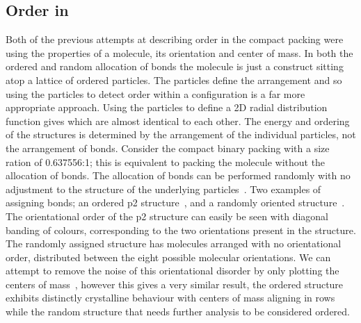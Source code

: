 \subsection{Order in \scon}

Both of the previous attempts at describing order in the compact packing were using the properties of a molecule, its orientation and center of mass. In both the ordered and random allocation of bonds the molecule is just a construct sitting atop a lattice of ordered particles. The particles define the arrangement and so using the particles to detect order within a configuration is a far more appropriate approach. Using the particles to define a 2D radial distribution function gives  which are almost identical to each other. The energy and ordering of the structures is determined by the arrangement of the individual particles, not the arrangement of bonds.
Consider the compact binary packing with a size ration of 0.637556:1; this is equivalent to packing the \scon molecule without the allocation of bonds. The allocation of bonds can be performed randomly with no adjustment to the structure of the underlying particles~. Two examples of assigning bonds; an ordered p2 structure~, and a randomly oriented structure~. The orientational order of the p2 structure can easily be seen with diagonal banding of colours, corresponding to the two orientations present in the structure. The randomly assigned structure has molecules arranged with no orientational order, distributed between the eight possible molecular orientations. We can attempt to remove the noise of this orientational disorder by only plotting the centers of mass~, however this gives a very similar result, the ordered structure exhibits distinctly crystalline behaviour with centers of mass aligning in rows while the random structure that needs further analysis to be considered ordered.

